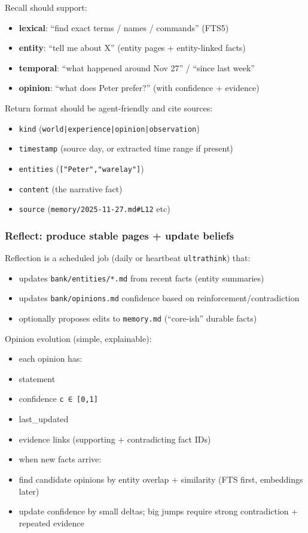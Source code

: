 Recall should support:

\begin{itemize}
  \item \textbf{lexical}: “find exact terms / names / commands” (FTS5)
  \item \textbf{entity}: “tell me about X” (entity pages + entity-linked facts)
  \item \textbf{temporal}: “what happened around Nov 27” / “since last week”
  \item \textbf{opinion}: “what does Peter prefer?” (with confidence + evidence)
\end{itemize}


Return format should be agent-friendly and cite sources:

\begin{itemize}
  \item \texttt{kind} (\texttt{world|experience|opinion|observation})
  \item \texttt{timestamp} (source day, or extracted time range if present)
  \item \texttt{entities} (\texttt{["Peter","warelay"]})
  \item \texttt{content} (the narrative fact)
  \item \texttt{source} (\texttt{memory/2025-11-27.md\#L12} etc)
\end{itemize}


\subsubsection{Reflect: produce stable pages + update beliefs}


Reflection is a scheduled job (daily or heartbeat \texttt{ultrathink}) that:

\begin{itemize}
  \item updates \texttt{bank/entities/*.md} from recent facts (entity summaries)
  \item updates \texttt{bank/opinions.md} confidence based on reinforcement/contradiction
  \item optionally proposes edits to \texttt{memory.md} (“core-ish” durable facts)
\end{itemize}


Opinion evolution (simple, explainable):

\begin{itemize}
  \item each opinion has:
  \item statement
  \item confidence \texttt{c ∈ [0,1]}
  \item last\_updated
  \item evidence links (supporting + contradicting fact IDs)
  \item when new facts arrive:
  \item find candidate opinions by entity overlap + similarity (FTS first, embeddings later)
  \item update confidence by small deltas; big jumps require strong contradiction + repeated evidence
\end{itemize}


